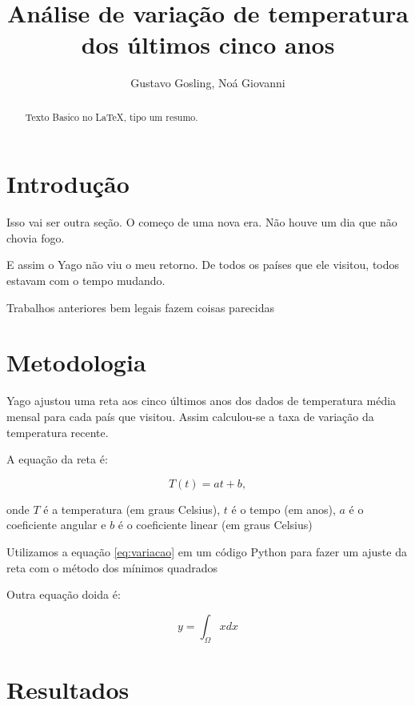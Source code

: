 \documentclass{article}
\begin{document}
\title{Análise de variação de temperatura dos últimos cinco anos}
\author{Gustavo Gosling, Noá Giovanni}

\maketitle


\begin{abstract}
Texto Basico no LaTeX, tipo um resumo.

\end{abstract}

\section{Introdução}

Isso vai ser outra seção.
O começo de uma nova era. Não houve um dia que não chovia fogo.

E assim o Yago não viu o meu retorno. De todos os países que ele visitou,
 todos estavam com o tempo mudando.
 
Trabalhos anteriores bem legais fazem coisas parecidas \citep{Osman2021}

\section{Metodologia}

Yago ajustou uma reta aos cinco últimos anos dos dados de temperatura
 média mensal para cada país que visitou.
Assim calculou-se a taxa de variação da temperatura recente.

A equação da reta é:

\begin{equation}
T(t)= a t + b,
\label{eq:variacao}
\end{equation}

\noindent
onde $T$ é a temperatura (em graus Celsius), $t$ é o tempo (em anos),
 $a$ é o coeficiente angular e $b$ é o coeficiente linear (em graus Celsius)

Utilizamos a equação \ref{eq:variacao} em um código Python para fazer um ajuste da reta com
o método dos mínimos quadrados

Outra equação doida é:

\begin{equation}
y = \int_\Omega x dx
\end{equation}

\section{Resultados}
\end{document}
